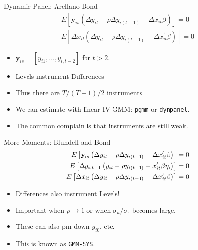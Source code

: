 \documentclass[aspectratio=169]{beamer}
\begin{document}
\begin{frame}{Dynamic Panel: Arellano Bond}
\begin{eqnarray*}
E\left[\mathbf{y}_{i s}\left(\Delta y_{i t}-\rho \Delta y_{i(t-1)}-\Delta x_{i t}^{\prime} \beta\right)\right]=0\\
E\left[\Delta x_{it} \left(\Delta y_{i t}-\rho \Delta y_{i(t-1)}-\Delta x_{i t}^{\prime} \beta\right)\right]=0
\end{eqnarray*}
\begin{itemize}
\item $\mathbf{y}_{is}= [y_{i1},\ldots,y_{i,t-2}]$ for $t>2$.
\item \alert{Levels} instrument \alert{Differences}
\item Thus there are $T/(T-1)/2$ instruments
\item We can estimate with linear IV GMM:  \texttt{pgmm} or \texttt{dynpanel}.
\item The common complain is that \alert{instruments are still weak}.
\end{itemize}
\end{frame}

\begin{frame}{More Moments: Blundell and Bond}
\begin{align*}
E\left[\mathbf{y}_{i s}\left(\Delta y_{i t}-\rho \Delta y_{i(t-1)}-\Delta x_{i t}^{\prime} \beta\right)\right]&=0\\
E\left[\Delta y_{i,t-1} \left(y_{i t}-\rho y_{i(t-1)}- x_{i t}^{\prime} \beta\-\eta_i \right)\right]&=0\\
E\left[\Delta x_{it} \left(\Delta y_{i t}-\rho \Delta y_{i(t-1)}-\Delta x_{i t}^{\prime} \beta\right)\right]&=0
\end{align*}
\begin{itemize}
\item \alert{Differences} also instrument \alert{Levels}!
\item Important when $\rho \rightarrow 1$ or when $\sigma_u/\sigma_{\epsilon}$ becomes large.
\item These can also pin down $y_{i0}$, etc.
\item This is known as \texttt{GMM-SYS}.
\end{itemize}
\end{frame}
\end{document}

